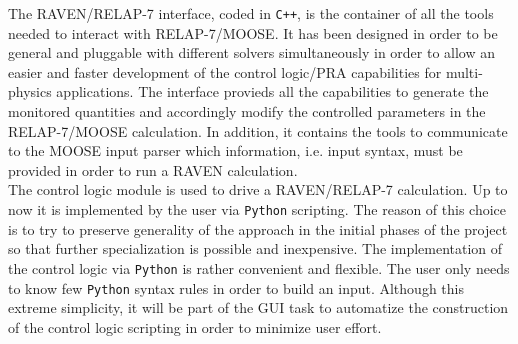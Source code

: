 \documentclass{anstrans}
\begin{document}
The RAVEN/RELAP-7 interface, coded in \verb!C++!, is the container of all the tools needed to interact with RELAP-7/MOOSE. It has been designed in order to be general and pluggable with different solvers simultaneously in order to allow an easier and faster development of the control logic/PRA capabilities for multi-physics applications.
The interface provieds all the capabilities to generate the monitored quantities and accordingly modify the controlled parameters in the RELAP-7/MOOSE calculation.
In addition, it contains the tools to communicate to the MOOSE input parser which information, i.e. input syntax, must be provided in order to run a RAVEN  calculation.\\The control logic module is used to drive a RAVEN/RELAP-7 calculation. Up to now it is implemented by the user via \verb!Python! scripting. The reason of this choice is to try to preserve generality of the approach in the initial phases of the project so that further specialization is possible and  inexpensive. The implementation of the control logic via \verb!Python! is rather convenient and flexible. The user only needs to know few \verb!Python! syntax rules in order to build an input. Although this extreme simplicity, it will be part of the GUI task to automatize the construction of the control logic scripting in order to minimize user effort. 
\end{document}

